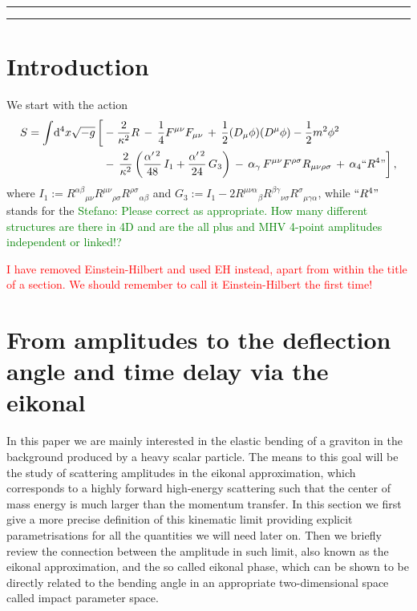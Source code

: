 \documentclass[a4paper,11pt]{article}
\numberwithin{equation}{section}
\begin{document}
\setcounter{page}{0}
\thispagestyle{empty}
\newpage


\setcounter{tocdepth}{4}
\hrule height 0.75pt
\tableofcontents
\vspace{0.8cm}
\hrule height 0.75pt
\vspace{1cm}
\setcounter{tocdepth}{2}

\newpage
\section{Introduction} 

We start with the action
\begin{align}
\begin{split}
\label{action}
S = \int\!\dd[4] x\sqrt{-g} \,  \bigg[ &-\frac{2}{\kappa^2}R   \, - \, \frac{1}{4} F^{\mu \nu} F_{\mu\nu}\, +\, \frac{1}{2} (D_{\mu} \phi)( D^{\mu}\phi) - \frac{1}{2} m^2 \phi^2\\
&- \,  {2\over \kappa^2} \left( {\alpha^{\prime \, 2} \over 48} \, I_1 + {\alpha^{\prime \, 2} \over 24} \, G_3 \right) \, - \, \alpha_{\gamma} \, F^{\mu\nu} F^{\rho \sigma} R_{\mu \nu \rho \sigma} \, + \, \alpha_{4}``R^4 " \bigg] \, , 
\end{split}
\end{align}
where $I_1 := {R^{\alpha \beta}}_{\mu \nu} {R^{\mu \nu}}_{\rho \sigma} {R^{\rho \sigma}}_{\alpha \beta}$
and $G_3 := I_1 - 2 {R^{\mu \nu \alpha}}_\beta {R^{\beta \gamma}}_{\nu \sigma} {R^\sigma}_{\mu \gamma \alpha}$, 
while  $``R^4"$ stands for the 
\textcolor{green}{Stefano: Please correct as appropriate. How many different structures are there in 4D and are the all plus and MHV 4-point amplitudes independent or linked!?} 

\textcolor{red}{I have removed Einstein-Hilbert and used   EH instead, apart from within the title of a section. We should remember to call it Einstein-Hilbert the first time!}


\section{From amplitudes  to the deflection angle  and time delay via the eikonal}

In this paper we are mainly interested in the elastic bending of a graviton in the background produced by
a heavy scalar particle. The means to this
goal will be the study of scattering amplitudes in the eikonal  approximation, which corresponds to a highly forward high-energy scattering such that the center of mass energy is much larger than the momentum transfer. In this section we first give a more precise definition of this kinematic limit providing explicit parametrisations for all the quantities we will need later on. Then we briefly review the connection between the amplitude in such limit, also known as the eikonal approximation, and the so called eikonal phase, which can be shown to be directly related to the bending angle in an appropriate two-dimensional space called impact parameter space.
\end{document}
